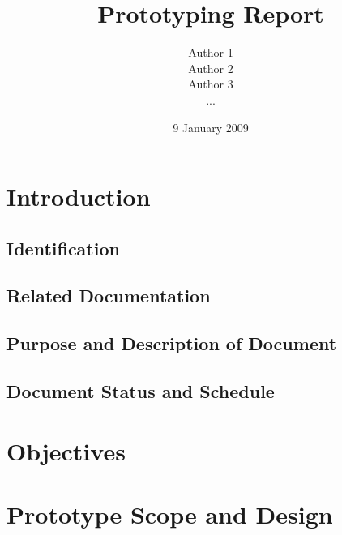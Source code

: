 \documentclass{l3deliverable}
\title{Prototyping Report}
\author{Author 1 \\
        Author 2 \\
        Author 3 \\
        ...}
\date{9 January 2009}
\begin{document}

\maketitle

\tableofcontents

\newpage


\section{Introduction}

\subsection{Identification}

\subsection{Related Documentation}

\subsection{Purpose and Description of Document}

\subsection{Document Status and Schedule}


\section{Objectives}


\section{Prototype Scope and Design}

\end{document}
